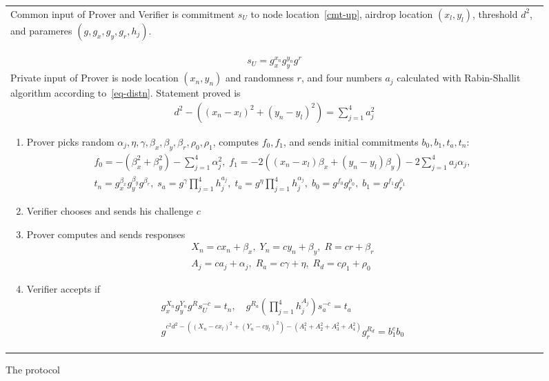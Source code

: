 \documentclass{llncs}
\begin{document}
\begin{figure}[!htb]
\begin{tabular}{|p{\linewidth}|}
\hline

Common input of Prover and Verifier is
  commitment $s_U$ to node location~\eqref{cmt-up},
  airdrop location $(x_l, y_l)$,
  threshold $d^2$,
  and parameres $(g, g_x, g_y, g_r, h_j)$. \\
\begin{gather}
\label{cmt-up}
  s_U = g_x^{x_n} g_y^{y_n} g^{r}
\end{gather}
Private input of Prover is
  node location $(x_n, y_n)$ and randomness $r$,
  and four numbers $a_j$ calculated with Rabin-Shallit algorithm according to~\eqref{eq-distn}.
Statement proved is
\begin{gather}
\label{eq-distn}
  d^2 - ((x_n - x_l)^2 + (y_n - y_l)^2) = \sum_{j=1}^4 a_j^2
\end{gather}

%
\begin{enumerate}
\item
  Prover picks random $\alpha_j, \eta, \gamma, \beta_x, \beta_y, \beta_r, \rho_0, \rho_1$,
  computes $f_0, f_1$, and sends initial commitments $b_0, b_1, t_a, t_n$:
\begin{gather}
  f_0 = -(\beta_x^2 + \beta_y^2) - \sum_{j=1}^4 \alpha_j^2,   \;
  f_1 = -2( (x_n - x_l) \beta_x  + (y_n - y_l) \beta_y) -2 \sum_{j=1}^4 a_j \alpha_j,   \\
%
  t_n = g_x^{\beta_x} g_y^{\beta_y} g^{\beta_r} ,   \;
  s_a = g^{\gamma} \prod_{j=1}^4 h_j^{a_j},   \;
  t_a = g^{\eta} \prod_{j=1}^4 h_j^{\alpha_j}, \;
  b_0 = g^{f_0} g_r^{\rho_0},  \;
  b_1 = g^{f_1} g_r^{\rho_1}
\end{gather}
%
\item
  Verifier chooses and sends his challenge $c$
\item
  Prover computes and sends responses
\begin{gather}
  X_n = c x_n + \beta_x,  \;
  Y_n = c y_n + \beta_y,  \;
  R = c r + \beta_r   \\
  A_j = c a_j + \alpha_j, \;
  R_a = c \gamma + \eta,   \;
  R_d = c \rho_1 + \rho_0
\end{gather}
%
\item
  Verifier accepts if
\begin{gather}
\label{verf-linear}
  g_x^{X_n} g_y^{Y_n} g^{R} s_U^{-c} = t_n, \quad
  g^{R_a} (\prod_{j=1}^4 h_j^{A_j}) s_a^{-c} = t_a \\
\label{verf-distn}
  g^{c^2 d^2 - ((X_n - c x_l)^2 + (Y_n - c y_l)^2) - (A_1^2 + A_2^2 + A_3^2 + A_4^2)} g_r^{R_d} = b_1^{c} b_0
\end{gather}
\end{enumerate}
\\
\hline
\end{tabular}
\caption{The protocol}
\label{fig}
\end{figure}
\end{document}

